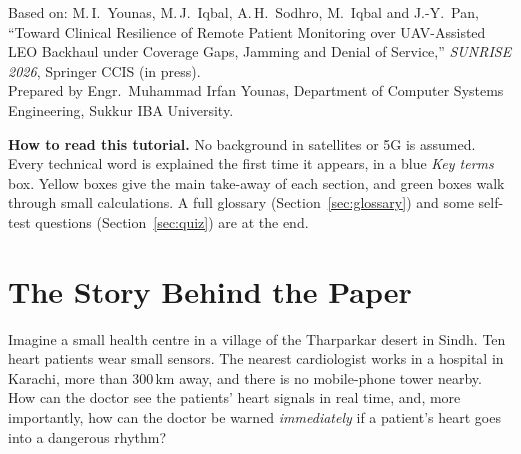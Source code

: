 \documentclass[11pt,a4paper]{article}
\begin{document}
\vspace*{4.4cm}

{\sffamily\small\color{slate}
Based on: M.\,I.\ Younas, M.\,J.\ Iqbal, A.\,H.\ Sodhro, M.\ Iqbal and J.-Y.\ Pan, ``Toward Clinical Resilience of Remote Patient Monitoring over UAV-Assisted LEO Backhaul under Coverage Gaps, Jamming and Denial of Service,'' \emph{SUNRISE 2026}, Springer CCIS (in press).\\[2pt]
Prepared by Engr.\ Muhammad Irfan Younas, Department of Computer Systems Engineering, Sukkur IBA University.\par}

\begin{idea}
\textsf{\textbf{How to read this tutorial.}} No background in satellites or 5G is assumed. Every technical word is explained the first time it appears, in a blue \emph{Key terms} box. Yellow boxes give the main take-away of each section, and green boxes walk through small calculations. A full glossary (Section~\ref{sec:glossary}) and some self-test questions (Section~\ref{sec:quiz}) are at the end.
\end{idea}

\tableofcontents

\section{The Story Behind the Paper}

Imagine a small health centre in a village of the Tharparkar desert in Sindh. Ten heart patients wear small sensors. The nearest cardiologist works in a hospital in Karachi, more than 300\,km away, and there is no mobile-phone tower nearby. How can the doctor see the patients' heart signals in real time, and, more importantly, how can the doctor be warned \emph{immediately} if a patient's heart goes into a dangerous rhythm?
\end{document}
